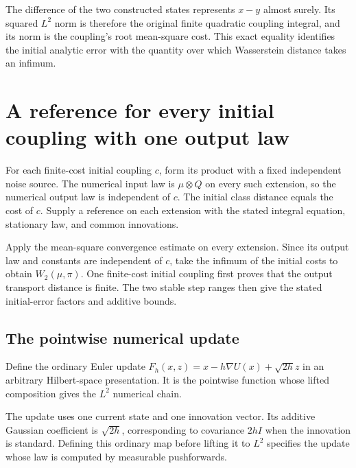\documentclass[11pt,a4paper]{report}
\begin{document}
The difference of the two constructed states represents \(x-y\) almost surely. Its squared \(L^2\) norm is therefore the original finite quadratic coupling integral, and its norm is the coupling's root mean-square cost. This exact equality identifies the initial analytic error with the quantity over which Wasserstein distance takes an infimum.

\section{\texorpdfstring{A reference for every initial coupling with one output law}{A reference for every initial coupling with one output law}}
\label{proof-module-UnadjustedLangevin-ProductReference-lean}


For each finite-cost initial coupling \(c\), form its product with a fixed independent noise source. The numerical input law is \(\mu\otimes Q\) on every such extension, so the numerical output law is independent of \(c\). The initial class distance equals the cost of \(c\). Supply a reference on each extension with the stated integral equation, stationary law, and common innovations.



Apply the mean-square convergence estimate on every extension. Since its output law and constants are independent of \(c\), take the infimum of the initial costs to obtain \(W_2(\mu,\pi)\). One finite-cost initial coupling first proves that the output transport distance is finite. The two stable step ranges then give the stated initial-error factors and additive bounds.

\subsection{\texorpdfstring{The pointwise numerical update}{The pointwise numerical update}}
\label{report-step-UnadjustedLangevin-ProductReference-lean-1}


Define the ordinary Euler update \(F_h(x,z)=x-h\nabla U(x)+\sqrt{2h}z\) in an arbitrary Hilbert-space presentation. It is the pointwise function whose lifted composition gives the \(L^2\) numerical chain.



The update uses one current state and one innovation vector. Its additive Gaussian coefficient is \(\sqrt{2h}\), corresponding to covariance \(2hI\) when the innovation is standard. Defining this ordinary map before lifting it to \(L^2\) specifies the update whose law is computed by measurable pushforwards.
\end{document}
